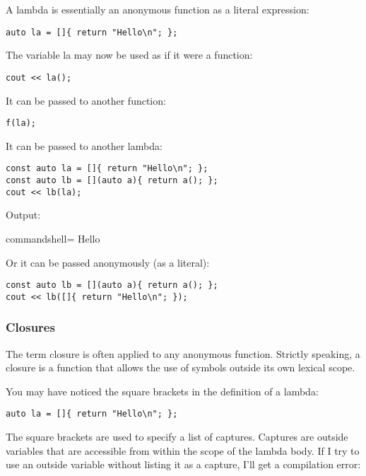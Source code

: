 
A lambda is essentially an anonymous function as a literal expression:

\begin{lstlisting}[style=styleCXX]
auto la = []{ return "Hello\n"; };
\end{lstlisting}

The variable la may now be used as if it were a function:

\begin{lstlisting}[style=styleCXX]
cout << la();
\end{lstlisting}

It can be passed to another function:

\begin{lstlisting}[style=styleCXX]
f(la);
\end{lstlisting}

It can be passed to another lambda:

\begin{lstlisting}[style=styleCXX]
const auto la = []{ return "Hello\n"; };
const auto lb = [](auto a){ return a(); };
cout << lb(la);
\end{lstlisting}

Output:

\begin{tcblisting}{commandshell={}}
Hello
\end{tcblisting}

Or it can be passed anonymously (as a literal):

\begin{lstlisting}[style=styleCXX]
const auto lb = [](auto a){ return a(); };
cout << lb([]{ return "Hello\n"; });
\end{lstlisting}

\subsubsection{Closures}

The term closure is often applied to any anonymous function. Strictly speaking, a closure is a function that allows the use of symbols outside its own lexical scope.

You may have noticed the square brackets in the definition of a lambda:

\begin{lstlisting}[style=styleCXX]
auto la = []{ return "Hello\n"; };
\end{lstlisting}

The square brackets are used to specify a list of captures. Captures are outside variables that are accessible from within the scope of the lambda body. If I try to use an outside variable without listing it as a capture, I'll get a compilation error:

